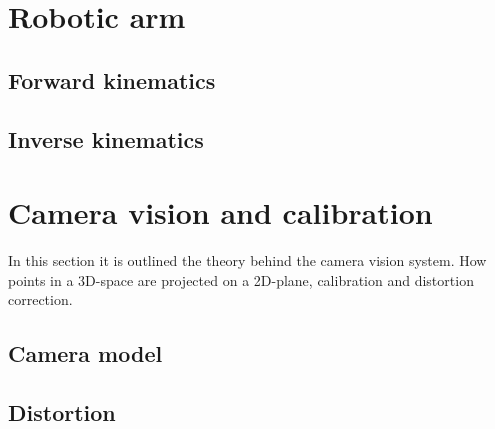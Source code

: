\section*{Robotic arm}
\subsection*{Forward kinematics}
\subsection*{Inverse kinematics}

\section*{Camera vision and calibration}
In this section it is outlined the theory behind the camera vision system. 
How points in a 3D-space are projected on a 2D-plane, calibration and distortion correction. 
\subsection*{Camera model}
\subsection*{Distortion}